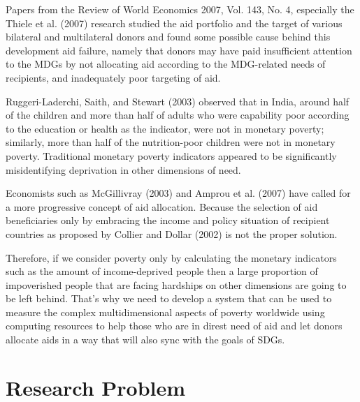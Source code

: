 \documentclass{swfuthesise}
\begin{document}
Papers from the Review of World Economics 2007, Vol. 143, No. 4, especially the Thiele et al. (2007)\cite{thiele2007donors} research studied the aid portfolio and the target of various bilateral and multilateral donors and found some possible cause behind this development aid failure, namely that donors may have paid insufficient attention to the MDGs by not allocating aid according to the MDG-related needs of recipients, and inadequately poor targeting of aid. 

Ruggeri-Laderchi, Saith, and Stewart (2003)\cite{laderchi2003does} observed that in India, around half of the children and more than half of adults who were capability poor according to the education or health as the indicator, were not in monetary poverty; similarly, more than half of the nutrition-poor children were not in monetary poverty. Traditional monetary poverty indicators appeared to be significantly misidentifying deprivation in other dimensions of need. 

Economists such as McGillivray (2003)\cite{mcgillivray2003aid} and Amprou et al. (2007)\cite{amprou2007aid} have called for a more progressive concept of aid allocation. Because the selection of aid beneficiaries only by embracing the income and policy situation of recipient countries as proposed by Collier and Dollar (2002)\cite{collier2002aid} is not the proper solution. 

Therefore, if we consider poverty only by calculating the monetary indicators such as the amount of income-deprived people then a large proportion of impoverished people that are facing hardships on other dimensions are going to be left behind. That's why we need to develop a system that can be used to measure the complex multidimensional aspects of poverty worldwide using computing resources to help those who are in direst need of aid and let donors allocate aids in a way that will also sync with the goals of SDGs.


\section{Research Problem}
\end{document}
